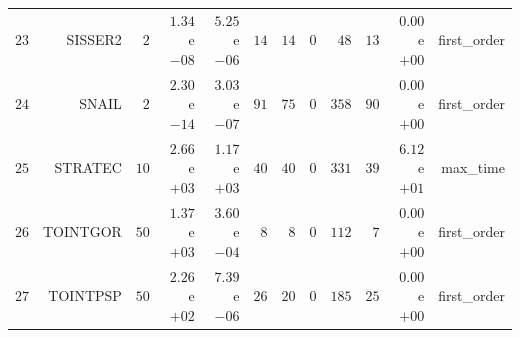 \begin{longtable}{rrrrrrrrrrrr}
  \(    23\) & SISSER2 & \(     2\) & \( 1.34\)e\(-08\) & \( 5.25\)e\(-06\) & \(    14\) & \(    14\) & \(     0\) & \(    48\) & \(    13\) & \( 0.00\)e\(+00\) & first\_order \\
  \(    24\) & SNAIL & \(     2\) & \( 2.30\)e\(-14\) & \( 3.03\)e\(-07\) & \(    91\) & \(    75\) & \(     0\) & \(   358\) & \(    90\) & \( 0.00\)e\(+00\) & first\_order \\
  \(    25\) & STRATEC & \(    10\) & \( 2.66\)e\(+03\) & \( 1.17\)e\(+03\) & \(    40\) & \(    40\) & \(     0\) & \(   331\) & \(    39\) & \( 6.12\)e\(+01\) & max\_time \\
  \(    26\) & TOINTGOR & \(    50\) & \( 1.37\)e\(+03\) & \( 3.60\)e\(-04\) & \(     8\) & \(     8\) & \(     0\) & \(   112\) & \(     7\) & \( 0.00\)e\(+00\) & first\_order \\
  \(    27\) & TOINTPSP & \(    50\) & \( 2.26\)e\(+02\) & \( 7.39\)e\(-06\) & \(    26\) & \(    20\) & \(     0\) & \(   185\) & \(    25\) & \( 0.00\)e\(+00\) & first\_order \\\hline
\end{longtable}
